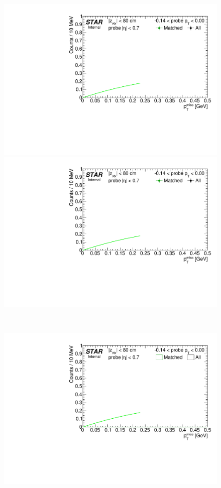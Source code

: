 \begin{figure}[ht]\ContinuedFloat
\centering
\parbox{0.495\textwidth}{
  \centering
  \includegraphics[width=\linewidth,page=7]{graphics/systematicsEfficiency/TOF_tagAndProbe/Fitting_effVsPt_data.pdf}\\
  \includegraphics[width=\linewidth,page=8]{graphics/systematicsEfficiency/TOF_tagAndProbe/Fitting_effVsPt_data.pdf}
}~
\parbox{0.495\textwidth}{
  \centering
  \includegraphics[width=\linewidth,page=7]{graphics/systematicsEfficiency/TOF_tagAndProbe/Fitting_effVsPt_mc.pdf}\\
}
\end{figure}
